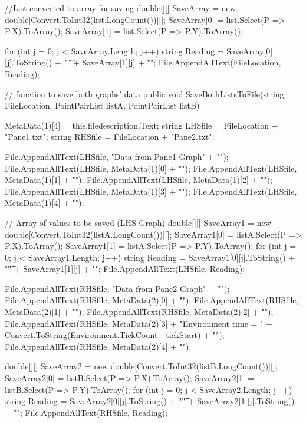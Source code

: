 {{{            //List converted to array for saving
            double[][] SaveArray = new double[Convert.ToInt32(list.LongCount())][];
            SaveArray[0] = list.Select(P => P.X).ToArray();
            SaveArray[1] = list.Select(P => P.Y).ToArray();

            for (int j = 0; j < SaveArray.Length; j++)
            {
                string Reading = SaveArray[0][j].ToString() + "\t" + SaveArray[1][j] + "\r\n";
                File.AppendAllText(FileLocation, Reading);
            }
        }


        // function to save both graphs' data 
        public void SaveBothListsToFile(string FileLocation, PointPairList listA, PointPairList listB)
        {
            MetaData(1)[4] = this.filedescription.Text;
            string LHSfile = FileLocation + "Pane1.txt";
            string RHSfile = FileLocation + "Pane2.txt";

            File.AppendAllText(LHSfile, "Data from Pane1 Graph" + "\r\n");
            File.AppendAllText(LHSfile, MetaData(1)[0] + "\r\n");
            File.AppendAllText(LHSfile, MetaData(1)[1] + "\r\n");
            File.AppendAllText(LHSfile, MetaData(1)[2] + "\r\n");
            File.AppendAllText(LHSfile, MetaData(1)[3] + "\r\n");
            File.AppendAllText(LHSfile, MetaData(1)[4] + "\r\n");

            // Array of values to be saved (LHS Graph)
            double[][] SaveArray1 = new double[Convert.ToInt32(listA.LongCount())][];
            SaveArray1[0] = listA.Select(P => P.X).ToArray();
            SaveArray1[1] = listA.Select(P => P.Y).ToArray();
            for (int j = 0; j < SaveArray1.Length; j++)
            {
                string Reading = SaveArray1[0][j].ToString() + "\t" + SaveArray1[1][j] + "\r\n";
                File.AppendAllText(LHSfile, Reading);
            }

            File.AppendAllText(RHSfile, "Data from Pane2 Graph" + "\r\n");
            File.AppendAllText(RHSfile, MetaData(2)[0] + "\r\n");
            File.AppendAllText(RHSfile, MetaData(2)[1] + "\r\n");
            File.AppendAllText(RHSfile, MetaData(2)[2] + "\r\n");
            File.AppendAllText(RHSfile, MetaData(2)[3] + "Environment time = " + Convert.ToString(Environment.TickCount - tickStart) + "\r\n");
            File.AppendAllText(RHSfile, MetaData(2)[4] + "\r\n");

            double[][] SaveArray2 = new double[Convert.ToInt32(listB.LongCount())][];
            SaveArray2[0] = listB.Select(P => P.X).ToArray();
            SaveArray2[1] = listB.Select(P => P.Y).ToArray();
            for (int j = 0; j < SaveArray2.Length; j++)
            {
                string Reading = SaveArray2[0][j].ToString() + "\t" + SaveArray2[1][j].ToString() + "\r\n";
                File.AppendAllText(RHSfile, Reading);
            }

}}}
